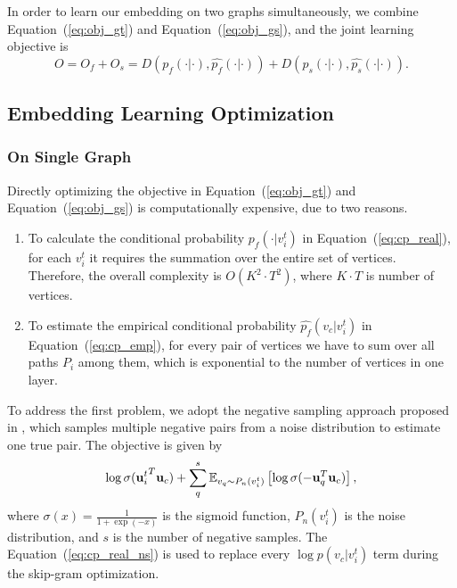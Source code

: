 In order to learn our embedding on two graphs simultaneously, we combine Equation~(\ref{eq:obj_gt}) and Equation~(\ref{eq:obj_gs}), and the joint learning objective is
\begin{equation}
O = O_f + O_s = D(p_f(\cdot|\cdot), \hat{p_f}(\cdot|\cdot)) + D(p_s(\cdot|\cdot), \hat{p_s}(\cdot|\cdot)).
\end{equation}



\subsection{Embedding Learning Optimization}


\subsubsection{On Single Graph}
\label{sec:sample}

Directly optimizing the objective in Equation~(\ref{eq:obj_gt}) and Equation~(\ref{eq:obj_gs}) is computationally expensive, due to two reasons. 
\begin{enumerate}
\item To calculate the conditional probability $p_f(\cdot | v_i^t)$ in Equation~(\ref{eq:cp_real}), for each $v_i^t$ it requires the summation over the entire set of vertices. Therefore, the overall complexity is $O(K^2\cdot T^2)$, where $K \cdot T$ is number of vertices.
\item To estimate the empirical conditional probability $\hat{p_f} (v_c | v_i^t)$ in Equation~(\ref{eq:cp_emp}), for every pair of vertices we have to sum over all paths $P_i$ among them, which is exponential to the number of vertices in one layer.
\end{enumerate}

To address the first problem, we adopt the negative sampling approach proposed in \cite{mikolov2013distributed}, which samples multiple negative pairs from a noise distribution to estimate one true pair. The objective is given by
\begin{equation}
\label{eq:cp_real_ns}
\log \sigma ( {\mathbf{u}_i^t}^T \mathbf{u}_c) + \sum_q^s \mathbb{E}_{v_q \sim P_n(v_i^t)} \left[ \log \sigma(- \mathbf{u}_q^T \mathbf{u}_c) \right],
\end{equation}
where $\sigma (x) = \frac{1}{1+\exp(-x)}$ is the sigmoid function, $P_n(v_i^t)$ is the noise distribution, and $s$ is the number of negative samples. The Equation~(\ref{eq:cp_real_ns}) is used to replace every $\log p(v_c | v_i^t) $ term during the skip-gram optimization.



